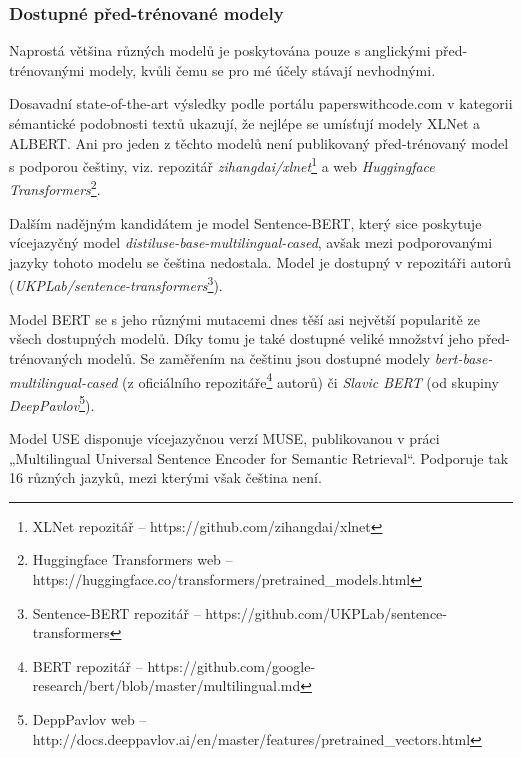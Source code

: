\documentclass[thesis=M,czech]{FITthesis}[2019/12/23]
\begin{document}
\subsubsection{Dostupné před-trénované modely}
Naprostá většina různých modelů je poskytována pouze s anglickými před-trénovanými modely, kvůli čemu se pro mé účely stávají nevhodnými.

Dosavadní state-of-the-art výsledky podle portálu paperswithcode.com v kategorii sémantické podobnosti textů ukazují, že nejlépe se umísťují modely XLNet a ALBERT\cite{lan2019}. Ani pro jeden z těchto modelů není publikovaný před-trénovaný model s podporou češtiny, viz. repozitář \textit{zihangdai/xlnet}\footnote{XLNet repozitář -- https://github.com/zihangdai/xlnet} a web \textit{Huggingface Transformers}\footnote{Huggingface Transformers web -- https://huggingface.co/transformers/pretrained\_models.html}. 

Dalším nadějným kandidátem je model Sentence-BERT, který sice poskytuje vícejazyčný model \textit{distiluse-base-multilingual-cased}, avšak mezi podporovanými jazyky tohoto modelu se čeština nedostala. Model je dostupný v repozitáři autorů (\textit{UKPLab/sentence-transformers}\footnote{Sentence-BERT repozitář --  https://github.com/UKPLab/sentence-transformers}).

Model BERT se s jeho různými mutacemi dnes těší asi největší popularitě ze všech dostupných modelů. Díky tomu je také dostupné veliké množství jeho před-trénovaných modelů. Se zaměřením na češtinu jsou dostupné modely \textit{bert-base-multilingual-cased} (z oficiálního repozitáře\footnote{BERT repozitář -- https://github.com/google-research/bert/blob/master/multilingual.md} autorů) či \textit{Slavic BERT} (od skupiny \textit{DeepPavlov}\footnote{DeppPavlov web -- http://docs.deeppavlov.ai/en/master/features/pretrained\_vectors.html}).

Model USE disponuje vícejazyčnou verzí MUSE, publikovanou v práci „Multilingual Universal Sentence Encoder for Semantic Retrieval“\cite{yang2019b}. Podporuje tak 16 různých jazyků, mezi kterými však čeština není.
\end{document}
